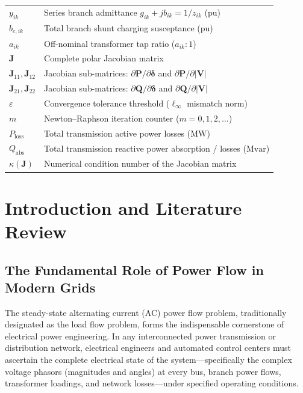 \documentclass[12pt,a4paper,oneside]{report}
\begin{document}
\begin{longtable}{ll}
$y_{ik}$ & Series branch admittance $g_{ik} + jb_{ik} = 1/z_{ik}$ ($\text{pu}$) \\
$b_{c,ik}$ & Total branch shunt charging susceptance ($\text{pu}$) \\
$a_{ik}$ & Off-nominal transformer tap ratio ($a_{ik}:1$) \\
$\mathbf{J}$ & Complete polar Jacobian matrix \\
$\mathbf{J}_{11}, \mathbf{J}_{12}$ & Jacobian sub-matrices: $\partial \mathbf{P} / \partial \boldsymbol{\delta}$ and $\partial \mathbf{P} / \partial |\mathbf{V}|$ \\
$\mathbf{J}_{21}, \mathbf{J}_{22}$ & Jacobian sub-matrices: $\partial \mathbf{Q} / \partial \boldsymbol{\delta}$ and $\partial \mathbf{Q} / \partial |\mathbf{V}|$ \\
$\varepsilon$ & Convergence tolerance threshold ($\ell_\infty$ mismatch norm) \\
$m$ & Newton--Raphson iteration counter ($m = 0, 1, 2, \dots$) \\
$P_{\text{loss}}$ & Total transmission active power losses ($\text{MW}$) \\
$Q_{\text{abs}}$ & Total transmission reactive power absorption / losses ($\text{Mvar}$) \\
$\kappa(\mathbf{J})$ & Numerical condition number of the Jacobian matrix \\
\bottomrule
\end{longtable}

\clearpage

\tableofcontents
\clearpage
\listoffigures
\clearpage
\listoftables
\clearpage


\chapter{Introduction and Literature Review}

\section{The Fundamental Role of Power Flow in Modern Grids}
The steady-state alternating current (AC) power flow problem, traditionally designated as the load flow problem, forms the indispensable cornerstone of electrical power engineering. In any interconnected power transmission or distribution network, electrical engineers and automated control centers must ascertain the complete electrical state of the system---specifically the complex voltage phasors (magnitudes and angles) at every bus, branch power flows, transformer loadings, and network losses---under specified operating conditions.
\end{document}

